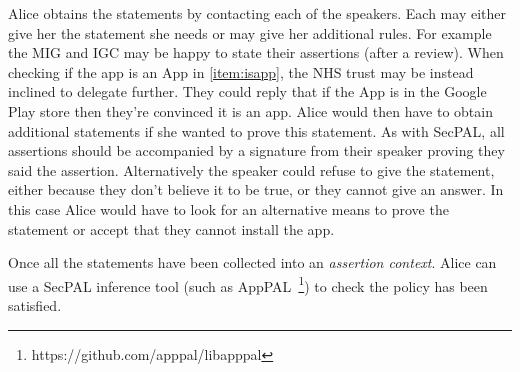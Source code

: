 \documentclass{llncs}
\begin{document}
Alice obtains the statements by contacting each of the speakers. 
Each may either give her the statement she needs or may give her additional rules.
For example the MIG and IGC may be happy to state their assertions (after a review).
When checking if the app is an App in \autoref{item:isapp}, the NHS trust may be instead inclined to delegate further.
They could reply that if the App is in the Google Play store then they're convinced it is an app.
Alice would then have to obtain additional statements if she wanted to prove this statement.
As with SecPAL, all assertions should be accompanied by a signature from their speaker proving they said the assertion.
Alternatively the speaker could refuse to give the statement, either because they don't believe it to be true, or they cannot give an answer.
In this case Alice would have to look for an alternative means to prove the statement or accept that they cannot install the app.

Once all the statements have been collected into an \emph{assertion context}.
Alice can use a SecPAL inference tool (such as AppPAL~\footnote{https://github.com/apppal/libapppal}) to check the policy has been satisfied.
\end{document}

